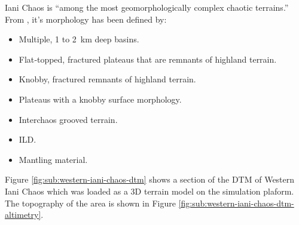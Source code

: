 Iani Chaos is ``among the most geomorphologically complex chaotic terrains.'' From  , it's morphology has been defined by:

\begin{itemize}
    \item Multiple, 1 to \SI{2}{\kilo\meter} deep basins.
    \item Flat‐topped, fractured plateaus that are remnants of highland terrain.
    \item Knobby, fractured remnants of highland terrain.
    \item Plateaus with a knobby surface morphology.
    \item Interchaos grooved terrain.
    \item \ac{ILD}.
    \item Mantling material.
\end{itemize}

Figure \ref{fig:sub:western-iani-chaos-dtm} shows a section of the \ac{DTM} of Western Iani Chaos which was loaded as a 3D terrain model on the simulation plaform. The topography of the area is shown in Figure \ref{fig:sub:western-iani-chaos-dtm-altimetry}.

\vspace{0.5cm}

